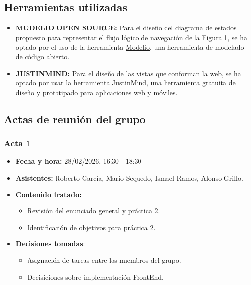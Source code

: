 \documentclass[12pt,a4paper]{article}
\begin{document}
\subsection{Herramientas utilizadas}
\begin{itemize}
    \item \textbf{MODELIO OPEN SOURCE: }Para el diseño del diagrama de estados propuesto para representar el flujo lógico de navegación de la \hyperref[fig1:arbol_nav]{Figura 1}, se ha optado por el uso de la herramienta \href{https://www.modelio.org/index.htm}{Modelio}, una herramienta de modelado de código abierto.
    \item \textbf{JUSTINMIND: }Para el diseño de las vistas que conforman la web, se ha optado por usar la herramienta \href{https://www.justinmind.com/es}{JustinMind}, una herramienta gratuita de diseño y prototipado para aplicaciones web y móviles.
\end{itemize}

\subsection{Actas de reunión del grupo}

\subsubsection{Acta 1}
\begin{itemize}
    \item \textbf{Fecha y hora: } 28/02/2026, 16:30 - 18:30
    \item \textbf{Asistentes: } Roberto García, Mario Sequedo, Ismael Ramos, Alonso Grillo.
    \item \textbf{Contenido tratado: } 
    \begin{itemize}
        \item [\tiny$\blacksquare$] Revisión del enunciado general y práctica 2.
        \item [\tiny$\blacksquare$] Identificación de objetivos para práctica 2.
    \end{itemize}
    \item \textbf{Decisiones tomadas: }
    \begin{itemize}
        \item [\tiny$\blacksquare$] Asignación de tareas entre los miembros del grupo.
        \item [\tiny$\blacksquare$] Decisiciones sobre implementación FrontEnd.
    \end{itemize}
\end{itemize}
\end{document}
